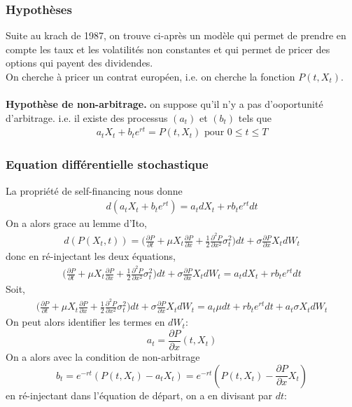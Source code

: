 \documentclass[a4paper]{article}
\begin{document}
\subsubsection{Hypothèses}

Suite au krach de 1987, on trouve ci-après un modèle qui permet de prendre en compte les taux et les volatilités non constantes et qui permet de pricer des options qui payent des dividendes.
\\
On cherche à pricer un contrat européen, i.e. on cherche la fonction $P(t,X_t)$.
\\
\vspace{2mm}\\
\textbf{Hypothèse de non-arbitrage.} on suppose qu'il n'y a pas d'ooportunité d'arbitrage. i.e. il existe des processus $(a_t)$ et $(b_t)$ tels que 
\begin{align*}
    a_t X_t + b_t e^{rt} = P(t,X_t) \text{  pour  } 0 \leq t \leq T
\end{align*}

\subsubsection{Equation différentielle stochastique}

La propriété de self-financing nous donne
\begin{align*}
    d( a_t X_t + b_t e^{rt} ) = a_t dX_t + r b_t e^{rt} dt
\end{align*}
On a alors grace au lemme d'Ito,
\begin{align*}
    d( P(X_t, t)) = \bigg(\frac{\partial P}{\partial t} + \mu X_t \frac{\partial P}{\partial x} + \frac{1}{2}\frac{\partial^2 P}{\partial x^2} \sigma_t^2 \bigg) dt + \sigma \frac{\partial P}{\partial x} X_t dW_t
\end{align*}
donc en ré-injectant les deux équations,
\begin{align*}
   \bigg(\frac{\partial P}{\partial t} + \mu X_t \frac{\partial P}{\partial x} + \frac{1}{2}\frac{\partial^2 P}{\partial x^2} \sigma_t^2 \bigg) dt + \sigma \frac{\partial P}{\partial x} X_t dW_t = a_t dX_t + r b_t e^{rt} dt
\end{align*}
Soit,
\begin{align*}
   \bigg(\frac{\partial P}{\partial t} + \mu X_t \frac{\partial P}{\partial x} + \frac{1}{2}\frac{\partial^2 P}{\partial x^2} \sigma_t^2 \bigg) dt + \sigma \frac{\partial P}{\partial x} X_t dW_t = a_t \mu dt + r b_t e^{rt} dt + a_t \sigma X_t dW_t
\end{align*}
On peut alors identifier les termes en $dW_t$:
\begin{equation}
    a_t = \frac{\partial P}{\partial x}(t,X_t)
\end{equation}
On a alors avec la condition de non-arbitrage
\begin{equation}
    b_t = e^{-rt}(P(t,X_t)-a_t X_t) = e^{-rt}(P(t,X_t)- \frac{\partial P}{\partial x} X_t) 
\end{equation}
en ré-injectant dans l'équation de départ, on a en divisant par $dt$:
\end{document}
